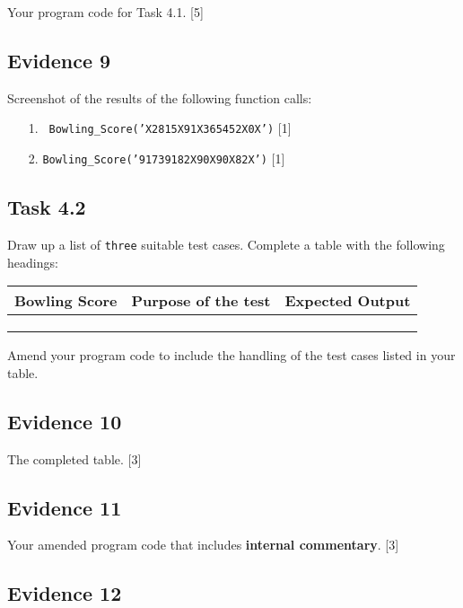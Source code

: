 Your program code for Task 4.1.\hfill{} {[}5{]}

\subsection*{Evidence 9 }

Screenshot of the results of the following function calls: 
\begin{enumerate}
\item[1.] \texttt{ Bowling\_Score('X2815X91X365452X0X')}\hfill{} {[}1{]}
\item[2.]  \texttt{Bowling\_Score('91739182X90X90X82X')} \hfill{} {[}1{]}
\end{enumerate}

\subsection*{Task 4.2 }

Draw up a list of \texttt{three} suitable test cases. Complete a table
with the following headings: 
\noindent \begin{center}
\begin{tabular}{|c|c|c|}
\hline 
Bowling Score & Purpose of the test & Expected Output \tabularnewline
\hline 
 &  & \tabularnewline
\hline 
 &  & \tabularnewline
\hline 
 &  & \tabularnewline
\hline 
\end{tabular}
\par\end{center}

Amend your program code to include the handling of the test cases
listed in your table. 

\subsection*{Evidence 10 }

The completed table.\hfill{} {[}3{]}

\subsection*{Evidence 11 }

Your amended program code that includes \textbf{internal commentary}.
\hfill{} {[}3{]}

\subsection*{Evidence 12 }

